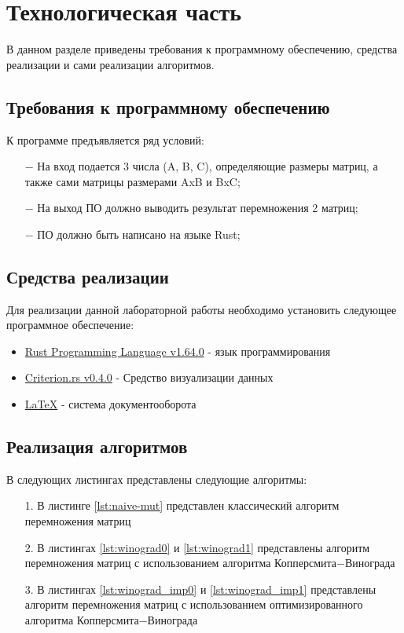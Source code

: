 \chapter{Технологическая часть}

В данном разделе приведены требования к программному обеспечению, средства реализации и сами реализации алгоритмов.

\section{Требования к программному обеспечению}
К программе предъявляется ряд условий:
\begin{itemize}
    \item[$-$] На вход подается 3 числа (A, B, C), определяющие размеры матриц, а также сами матрицы размерами AxB и BxC;
    \item[$-$] На выход ПО должно выводить результат перемножения 2 матриц;
    \item[$-$] ПО должно быть написано на языке Rust;
\end{itemize}

\section{Средства реализации}
Для реализации данной лабораторной работы необходимо установить следующее программное обеспечение:
\begin{itemize}
    \item \href{https://www.rust-lang.org/}{Rust Programming Language v1.64.0} - язык программирования
    \item \href{https://github.com/bheisler/criterion.rs}{Criterion.rs v0.4.0} - Средство визуализации данных
    \item \href{https://www.latex-project.org/}{LaTeX} - система документооборота
\end{itemize}

\section{Реализация алгоритмов}
В следующих листингах представлены следующие алгоритмы:
\begin{itemize}
    \item[1.] В листинге \ref{lst:naive-mut} представлен классический алгоритм перемножения матриц
    \item[2.] В листингах \ref{lst:winograd0} и \ref{lst:winograd1} представлены алгоритм перемножения матриц с использованием алгоритма Копперсмита$-$Винограда
    \item[3.] В листингах \ref{lst:winograd_imp0} и \ref{lst:winograd_imp1} представлены алгоритм перемножения матриц с использованием оптимизированного алгоритма Копперсмита$-$Винограда
\end{itemize}
\newpage

